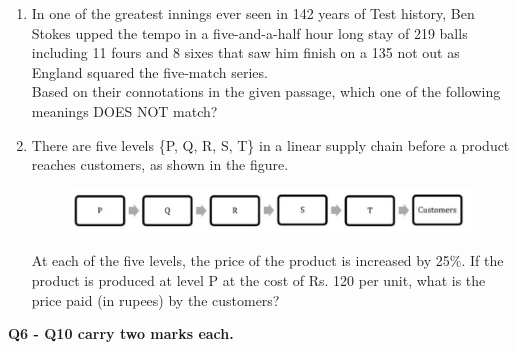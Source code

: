\documentclass[12pt,onecolumn]{article}
\begin{document}
\begin{enumerate}
    \item In one of the greatest innings ever seen in 142 years of Test history, Ben Stokes upped the tempo in a five-and-a-half hour long stay of 219 balls including 11 fours and 8 sixes that saw him finish on a 135 not out as England squared the five-match series.\\
          Based on their connotations in the given passage, which one of the following meanings DOES NOT match?
          \begin{enumerate}
          \end{enumerate}

    \item There are five levels \{P, Q, R, S, T\} in a linear supply chain before a product reaches customers, as shown in the figure.\\
          \begin{figure}[H]
              \centering
              \includegraphics[scale=0.4]{q5s2}
              \label{fig:q5s2}
          \end{figure}
          At each of the five levels, the price of the product is increased by 25\%. If the product is produced at level P at the cost of Rs. 120 per unit, what is the price paid (in rupees) by the customers?
          \begin{enumerate}
          \end{enumerate}
\end{enumerate}
\normalsize\textbf{Q6 - Q10 carry two marks each.}
\end{document}
